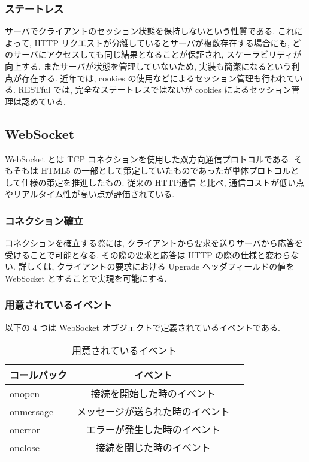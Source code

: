 \documentclass[a4j, 10pt, twocolumn]{ujarticle}
\begin{document}
    \subsubsection{ステートレス}
    サーバでクライアントのセッション状態を保持しないという性質である. これによって, HTTP リクエストが分離しているとサーバが複数存在する場合にも, どのサーバにアクセスしても同じ結果となることが保証され, スケーラビリティが向上する. またサーバが状態を管理していないため, 実装も簡潔になるという利点が存在する. 近年では, cookies の使用などによるセッション管理も行われている. RESTful では, 完全なステートレスではないが cookies によるセッション管理は認めている. 

    \subsection{WebSocket}
    \label{sec:rw_xxx}

    WebSocket とは TCP コネクションを使用した双方向通信プロトコルである.
    そもそもは HTML5 の一部として策定していたものであったが単体プロトコルとして仕様の策定を推進したもの.
    従来の HTTP通信 と比べ, 通信コストが低い点やリアルタイム性が高い点が評価されている. 
    \cite{stella2008comparative}
    
    \subsubsection{コネクション確立}
    \label{subsec:rw_yyy}
    
    コネクションを確立する際には, クライアントから要求を送りサーバから応答を受けることで可能となる.
    その際の要求と応答は HTTP の際の仕様と変わらない.
    詳しくは, クライアントの要求における Upgrade ヘッダフィールドの値を WebSocket とすることで実現を可能にする. 
    \cite{fette2011websocket}
    
    
    
    \subsubsection{用意されているイベント}
    
    以下の 4 つは WebSocket オブジェクトで定義されているイベントである.
    
    \label{subsec:rw_zzz}
    
    \begin{table}[hbtp]
      \caption{用意されているイベント}
      \label{table:data_type}
      \centering
      \begin{tabular}{lcr}
        \hline
        コールバック  & イベント  \\
        \hline \hline
        onopen  & 接続を開始した時のイベント   \\
        onmessage  & メッセージが送られた時のイベント   \\
        onerror  & エラーが発生した時のイベント   \\
        onclose  &  接続を閉じた時のイベント  \\
        \hline
      \end{tabular}
    \end{table}
\end{document}
